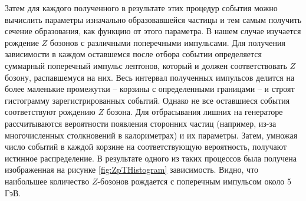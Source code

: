 \documentclass[12pt, a4paper]{article}
\begin{document}
Затем для каждого полученного в результате этих процедур события можно вычислить параметры изначально образовавшейся частицы и тем самым получить сечение образования, как функцию от этого параметра. В нашем случае изучается рождение $Z$ бозонов с различными поперечными импульсами. Для получения зависимости в каждом оставшемся после отбора событии определяется суммарный поперечный импульс лептонов, который и должен соответствовать $Z$ бозону, распавшемуся на них. 
Весь интервал полученных импульсов делится на более маленькие промежутки -- корзины с определенными границами -- и строят гистограмму зарегистрированных событий. Однако не все оставшиеся события соответствуют рождению $Z$ бозона. Для отбрасывания лишних на генераторе рассчитываются вероятности появления сторонних частиц (например, из-за многочисленных столкновений в калориметрах) и их параметры. Затем, умножая число событий в каждой корзине на соответствующую вероятность, получают истинное распределение. В результате одного из таких процессов \cite{pT_distributions} была получена изображенная на рисунке \ref{fig:ZpTHistogram} зависимость. Видно, что наибольшее количество $Z$-бозонов рождается с поперечным импульсом около 5 ГэВ.

%

\end{document}
